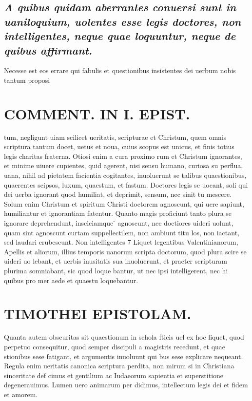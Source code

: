 \documentclass{article}
\begin{document}
\begin{pages}
\subsection*{\textit{A quibus quidam aberrantes conuersi sunt in uaniloquium, uolentes esse legis doctores, non intelligentes, neque quae loquuntur, neque de quibus affirmant. }}\pstart Necesse est eos errare qui fabulis et questionibus insistentes dei uerbum nobis tantum proposi\pend
\section*{COMMENT. IN I. EPIST. }
\marginpar{[ p.16 ]}\pstart tum, negligunt uiam scilicet ueritatis, scripturae et Christum, quem omnis scriptura tantum docet, uetus et noua, cuius scopus est unicus, et finis totius legis charitas fraterna. Otiosi enim a cura proximo rum et Christum ignorantes, et minime uiuere cupientes, quid agerent, nisi sensu humano, curiosa su perflua, uana, nihil ad pietatem facientia cogitantes, inuoluerunt se talibus quaestionibus, quaerentes seipsos, luxum, quaestum, et fastum.  \pend\pstart Doctores legis se uocant, soli qui dei uerba ignorant quod humiliat, et deprimit, sensum, nec sinit tu mescere. Solum enim Christum et spiritum Christi doctorem agnoscunt, qui uere sapiunt, humiliantur et ignorantiam fatentur. Quanto magis proficiunt tanto plura se ignorare deprehendunt, insciciamque ́ agnoscunt, nec doctiores uideri uolunt, quam sint agnoscunt curtam suppellectilem, non ambiunt titu los, non iactant, sed laudari erubescunt.  \pend\pstart Non intelligentes 7 Liquet legentibus Valentinianorum, Apellis et aliorum, illius temporis uanorum scripta doctorum, quod plura scire se uideri uo lebant, et uerbis inusitatis sua inuoluerunt, et praeter scripturam plurima somniabant, sic quod loque bantur, ut nec ipsi intelligerent, nec hi quibus pro mer aede et quaestu loquebantur.  \pend
\section*{TIMOTHEI EPISTOLAM. }
\marginpar{[ p.17 ]}\pstart Quanta autem obscuritas sit quaestionum in schola fticis uel ex hoc liquet, quod perpetuo consequitur, quod semper discipuli a magistris recedunt, et quae stionibus sese fatigant, et argumentis inuoluunt qui bus sese explicare nequeant. Regula enim ueritatis canonica scriptura perdita, non mirum si in Christiana sinceritate def cimus et gentilium ac Iudaeorum sapientia et superstitione degenerauimus. Lumen uero animarum per didimus, intellectum legis dei et fidem et amorem.  \pend
{}
{}

\end{pages}
\end{document}
